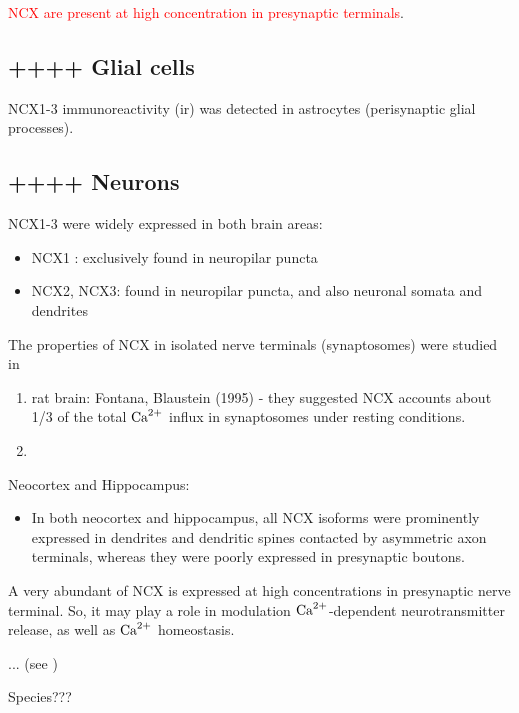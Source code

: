 \textcolor{red}{NCX  are present at high concentration in presynaptic
terminals}.

\subsection{++++ Glial cells}
\label{sec:NCX-glial-cell}

NCX1-3 immunoreactivity (ir) was detected in astrocytes (perisynaptic glial
processes).

\subsection{++++ Neurons}
\label{sec:NCX-distribution-neurons}


NCX1-3 were widely expressed in both brain areas:
\begin{itemize}
  \item NCX1 : exclusively found in neuropilar puncta 
  
  \item NCX2, NCX3: found in neuropilar puncta, and also neuronal somata and
  dendrites
\end{itemize}

The properties of NCX in isolated nerve terminals (synaptosomes) were studied in
\begin{enumerate}
  \item rat brain: Fontana, Blaustein (1995) - they suggested NCX accounts about
  1/3 of the total ${\text{Ca}^{2+}}$ influx in synaptosomes under resting conditions. 
  

  \item 
\end{enumerate}

Neocortex and Hippocampus:
\begin{itemize}

  \item  In both neocortex and hippocampus, all NCX isoforms were prominently
  expressed in dendrites and dendritic spines contacted by asymmetric axon
  terminals, whereas they were poorly expressed in presynaptic boutons.
\end{itemize}


A very abundant of NCX is expressed at high concentrations in
presynaptic nerve terminal. So, it may play a role in modulation
${\text{Ca}^{2+}}$-dependent neurotransmitter release, as well as ${\text{Ca}^{2+}}$
homeostasis.


... (see \citep{blaustein1999})


Species???


